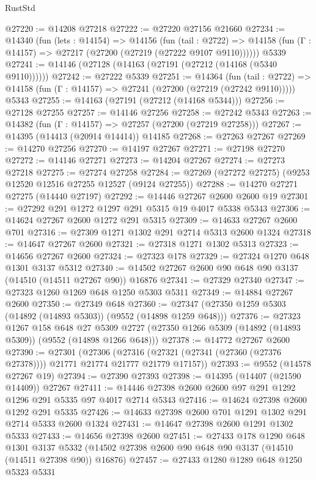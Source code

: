 \begin{lexlean}{RustStd}
\begin{coremodule}
@27220 := @14208 @27218
@27222 := @27220 @27156 @21660
@27234 := @14340
    (fun (lets : @14154) =>
    @14156
      (fun (tail : @2722) =>
      @14158 (fun (Γ : @14157) => @27217 (@27200 (@27219 (@27222 @9107 @9110))))))
    @5339
@27241 := @14146 (@27128 (@14163 (@27191 (@27212 (@14168 (@5340 @9110))))))
@27242 := @27222 @5339
@27251 := @14364
    (fun (tail : @2722) => @14158 (fun (Γ : @14157) => @27241 (@27200 (@27219 (@27242 @9110)))))
    @5343
@27255 := @14163 (@27191 (@27212 (@14168 @5344)))
@27256 := @27128 @27255
@27257 := @14146 @27256
@27258 := @27242 @5343
@27263 := @14382 (fun (Γ : @14157) => @27257 (@27200 (@27219 @27258)))
@27267 := @14395 (@14413 (@20914 @14414)) @14185
@27268 := @27263 @27267
@27269 := @14270 @27256
@27270 := @14197 @27267
@27271 := @27198 @27270
@27272 := @14146 @27271
@27273 := @14204 @27267
@27274 := @27273 @27218
@27275 := @27274 @27258
@27284 := @27269 (@27272 @27275) (@9253 @12520 @12516 @27255 @12527 (@9124 @27255))
@27288 := @14270 @27271 @27275 (@14440 @27197)
@27292 := @14446 @27267 @2600 @2600 @19
@27301 := @27292 @291 @1272 @1297 @291 @5315 @19 @4017 @5338 @5343
@27306 := @14624 @27267 @2600 @1272 @291 @5315
@27309 := @14633 @27267 @2600 @701
@27316 := @27309 @1271 @1302 @291 @2714 @5313 @2600 @1324
@27318 := @14647 @27267 @2600
@27321 := @27318 @1271 @1302 @5313
@27323 := @14656 @27267 @2600
@27324 := @27323 @178
@27329 := @27324 @1270 @648 @1301 @3137 @5312
@27340 := @14502 @27267 @2600 @90 @648 @90 @3137 (@14510 (@14511 @27267 @90)) @16876
@27341 := @27329 @27340
@27347 := @27323 @1260 @1269 @648 @1250 @5303 @5311
@27349 := @14884 @27267 @2600
@27350 := @27349 @648
@27360 := @27347 (@27350 @1259 @5303 (@14892 (@14893 @5303)) (@9552 (@14898 @1259 @648)))
@27376 := @27323
    @1267
    @158
    @648
    @27
    @5309
    @2727
    (@27350 @1266 @5309 (@14892 (@14893 @5309)) (@9552 (@14898 @1266 @648)))
@27378 := @14772 @27267 @2600
@27390 := @27301
    (@27306 (@27316 (@27321 (@27341 (@27360 (@27376 @27378)))) @21771 @21774 @21777 @21779 @17157))
@27393 := @9552 (@14578 @27267 @19)
@27394 := @27390 @27393
@27398 := @14395 (@14407 (@21590 @14409)) @27267
@27411 := @14446 @27398 @2600 @2600 @97 @291 @1292 @1296 @291 @5335 @97 @4017 @2714 @5343
@27416 := @14624 @27398 @2600 @1292 @291 @5335
@27426 := @14633 @27398 @2600 @701 @1291 @1302 @291 @2714 @5333 @2600 @1324
@27431 := @14647 @27398 @2600 @1291 @1302 @5333
@27433 := @14656 @27398 @2600
@27451 := @27433
    @178
    @1290
    @648
    @1301
    @3137
    @5332
    (@14502 @27398 @2600 @90 @648 @90 @3137 (@14510 (@14511 @27398 @90)) @16876)
@27457 := @27433 @1280 @1289 @648 @1250 @5323 @5331

\end{coremodule}
\end{lexlean}
